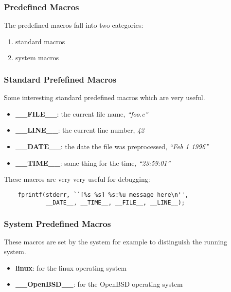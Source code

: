 \documentclass[9pt]{beamer}
\begin{document}

\begin{frame}
  \frametitle{Predefined Macros}

  The predefined macros fall into two categories:

  \begin{enumerate}
    \item
      standard macros
    \item
      system macros
  \end{enumerate}
\end{frame}


\begin{frame}[containsverbatim]
  \frametitle{Standard Prefefined Macros}

  Some interesting standard predefined macros which are very useful.

  \begin{itemize}
    \item
      \textbf{\_\_FILE\_\_}: the current file name, \textit{``foo.c''}
    \item
      \textbf{\_\_LINE\_\_}: the current line number, \textit{42}
    \item
      \textbf{\_\_DATE\_\_}: the date the file was preprocessed,
      \textit{``Feb 1 1996''}
    \item
      \textbf{\_\_TIME\_\_}: same thing for the time, \textit{``23:59:01''}
  \end{itemize}

  These macros are very very useful for debugging:

  \begin{verbatim}
    fprintf(stderr, ``[%s %s] %s:%u message here\n'', 
            __DATE__, __TIME__, __FILE__, __LINE__);
  \end{verbatim}
\end{frame}


\begin{frame}
  \frametitle{System Predefined Macros}

  These macros are set by the system for example to distinguish the
  running system.

  \begin{itemize}[<+->]
    \item
      \textbf{linux}: for the linux operating system
    \item
      \textbf{\_\_OpenBSD\_\_}: for the OpenBSD operating system
  \end{itemize}
\end{frame}
\end{document}
